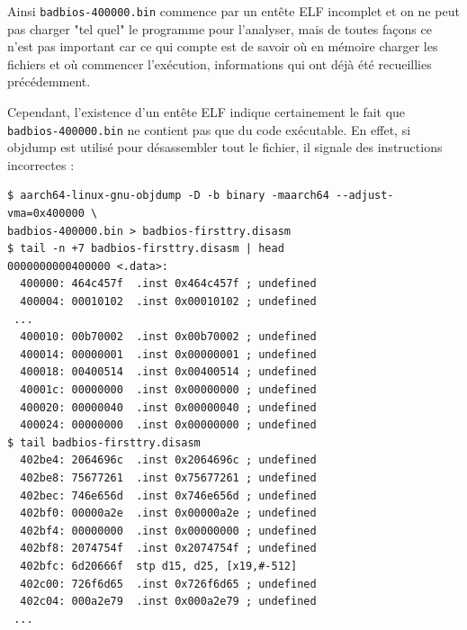 \documentclass[a4paper,10pt]{article}
\begin{document}
Ainsi \texttt{badbios-400000.bin} commence par un entête ELF incomplet et on ne peut pas charger "tel quel" le programme pour l'analyser, mais de toutes façons ce n'est pas important car ce qui compte est de savoir où en mémoire charger les fichiers et où commencer l'exécution, informations qui ont déjà été recueillies précédemment.

Cependant, l'existence d'un entête ELF indique certainement le fait que \texttt{badbios-400000.bin} ne contient pas que du code exécutable. En effet, si objdump est utilisé pour désassembler tout le fichier, il signale des instructions incorrectes :
\begin{verbatim}
$ aarch64-linux-gnu-objdump -D -b binary -maarch64 --adjust-vma=0x400000 \
badbios-400000.bin > badbios-firsttry.disasm
$ tail -n +7 badbios-firsttry.disasm | head
0000000000400000 <.data>:
  400000: 464c457f  .inst 0x464c457f ; undefined
  400004: 00010102  .inst 0x00010102 ; undefined
 ...
  400010: 00b70002  .inst 0x00b70002 ; undefined
  400014: 00000001  .inst 0x00000001 ; undefined
  400018: 00400514  .inst 0x00400514 ; undefined
  40001c: 00000000  .inst 0x00000000 ; undefined
  400020: 00000040  .inst 0x00000040 ; undefined
  400024: 00000000  .inst 0x00000000 ; undefined
$ tail badbios-firsttry.disasm
  402be4: 2064696c  .inst 0x2064696c ; undefined
  402be8: 75677261  .inst 0x75677261 ; undefined
  402bec: 746e656d  .inst 0x746e656d ; undefined
  402bf0: 00000a2e  .inst 0x00000a2e ; undefined
  402bf4: 00000000  .inst 0x00000000 ; undefined
  402bf8: 2074754f  .inst 0x2074754f ; undefined
  402bfc: 6d20666f  stp d15, d25, [x19,#-512]
  402c00: 726f6d65  .inst 0x726f6d65 ; undefined
  402c04: 000a2e79  .inst 0x000a2e79 ; undefined
 ...
\end{verbatim}
\end{document}
